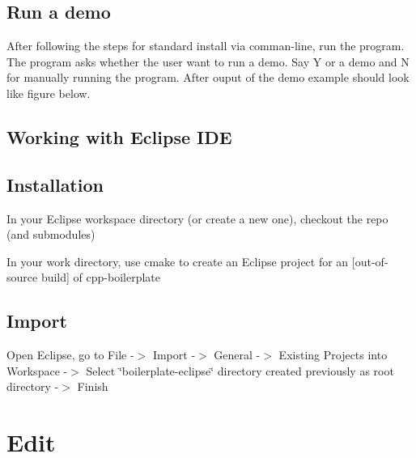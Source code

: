  \subsection*{Run a demo}

After following the steps for standard install via comman-\/line, run the program. The program asks whether the user want to run a demo. Say \textquotesingle{}Y\textquotesingle{} or a demo and \textquotesingle{}N\textquotesingle{} for manually running the program. After ouput of the demo example should look like figure below.

 

\subsection*{Working with Eclipse I\+DE}

\subsection*{Installation}

In your Eclipse workspace directory (or create a new one), checkout the repo (and submodules) 
\begin{DoxyCode}{0}
\end{DoxyCode}


In your work directory, use cmake to create an Eclipse project for an \mbox{[}out-\/of-\/source build\mbox{]} of cpp-\/boilerplate


\begin{DoxyCode}{0}
\end{DoxyCode}


\subsection*{Import}

Open Eclipse, go to File -\/$>$ Import -\/$>$ General -\/$>$ Existing Projects into Workspace -\/$>$ Select \char`\"{}boilerplate-\/eclipse\char`\"{} directory created previously as root directory -\/$>$ Finish

\section*{Edit}

